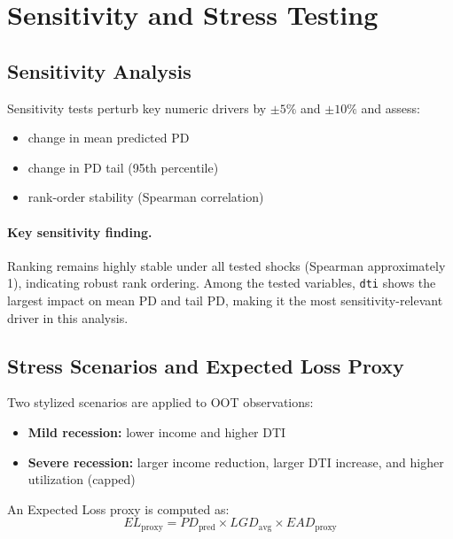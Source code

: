 \documentclass[11pt,a4paper]{article}
\begin{document}
\clearpage
\section{Sensitivity and Stress Testing}

\subsection{Sensitivity Analysis}
Sensitivity tests perturb key numeric drivers by \(\pm 5\%\) and \(\pm 10\%\) and assess:
\begin{itemize}[leftmargin=*, itemsep=0.25em]
\item change in mean predicted PD
\item change in PD tail (95th percentile)
\item rank-order stability (Spearman correlation)
\end{itemize}

\begin{table}[H]
\centering
\caption{Sensitivity analysis (OOT): PD shift and ranking stability under input shocks.}
\label{tab:sensitivity}

\end{table}

\paragraph{Key sensitivity finding.}
Ranking remains highly stable under all tested shocks (Spearman approximately 1), indicating robust rank ordering. Among the tested variables, \texttt{dti} shows the largest impact on mean PD and tail PD, making it the most sensitivity-relevant driver in this analysis.

\subsection{Stress Scenarios and Expected Loss Proxy}
Two stylized scenarios are applied to OOT observations:
\begin{itemize}[leftmargin=*, itemsep=0.25em]
\item \textbf{Mild recession:} lower income and higher DTI
\item \textbf{Severe recession:} larger income reduction, larger DTI increase, and higher utilization (capped)
\end{itemize}

An Expected Loss proxy is computed as:
\[
EL_{\text{proxy}} = PD_{\text{pred}} \times LGD_{\text{avg}} \times EAD_{\text{proxy}}
\]
\end{document}
